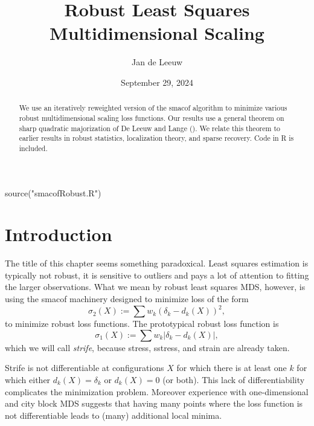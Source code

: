 \documentclass[
  12pt,
  letterpaper,
  DIV=11,
  numbers=noendperiod]{scrartcl}
\title{Robust Least Squares Multidimensional Scaling}
\author{Jan de Leeuw}
\date{September 29, 2024}
\newenvironment{Shaded}{\begin{snugshade}}{\end{snugshade}}
\newcommand{\FunctionTok}[1]{\textcolor[rgb]{0.28,0.35,0.67}{#1}}
\newcommand{\NormalTok}[1]{\textcolor[rgb]{0.00,0.23,0.31}{#1}}
\newcommand{\StringTok}[1]{\textcolor[rgb]{0.13,0.47,0.30}{#1}}
\newcommand{\sectionbreak}{\pagebreak}
\begin{document}
\maketitle
\begin{abstract}
We use an iteratively reweighted version of the smacof algorithm to
minimize various robust multidimensional scaling loss functions. Our
results use a general theorem on sharp quadratic majorization of De
Leeuw and Lange (). We relate
this theorem to earlier results in robust statistics, localization
theory, and sparse recovery. Code in R is included.
\end{abstract}


\sectionbreak

\begin{Shaded}
\begin{Highlighting}[]
\FunctionTok{source}\NormalTok{(}\StringTok{"smacofRobust.R"}\NormalTok{)}
\end{Highlighting}
\end{Shaded}

\section{Introduction}\label{introduction}

The title of this chapter seems something paradoxical. Least squares
estimation is typically not robust, it is sensitive to outliers and pays
a lot of attention to fitting the larger observations. What we mean by
robust least squares MDS, however, is using the smacof machinery
designed to minimize loss of the form \begin{equation}
\sigma_2(X):=\sum w_k(\delta_k-d_k(X))^2\label{eq:stressdef},
\end{equation} to minimize robust loss functions. The prototypical
robust loss function is \begin{equation}
\sigma_1(X):=\sum w_k|\delta_k-d_k(X)|\label{eq:stradddef},
\end{equation} which we will call \emph{strife}, because stress,
sstress, and strain are already taken.

Strife is not differentiable at configurations \(X\) for which there is
at least one \(k\) for which either \(d_k(X)=\delta_k\) or \(d_k(X)=0\)
(or both). This lack of differentiability complicates the minimization
problem. Moreover experience with one-dimensional and city block MDS
suggests that having many points where the loss function is not
differentiable leads to (many) additional local minima.
\end{document}

